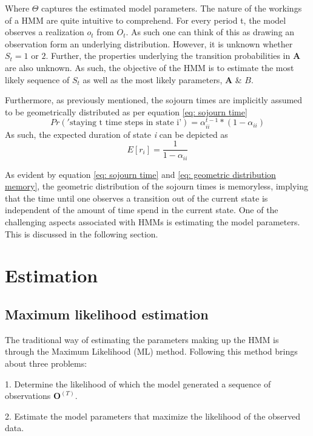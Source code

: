 Where $\Theta$ captures the estimated model parameters. The nature of the workings of a HMM are quite intuitive to comprehend. For every period t, the model observes a realization $o_t$ from $O_t$. As such one can think of this as drawing an observation form an underlying distribution. However, it is unknown whether $S_t = 1$ or $2$. Further, the properties underlying the transition probabilities in $\mathbf{A}$ are also unknown. As such, the objective of the HMM is to estimate the most likely sequence of $S_t$ as well as the most likely parameters, $\mathbf{A}$ \& $B$. 

Furthermore, as previously mentioned, the sojourn times are implicitly assumed to be geometrically distributed as per equation \ref{eq: sojourn time}
\begin{equation}
    Pr('\text{staying t time steps in state i'}) = \alpha^{t-1}_{ii} *(1-\alpha_{ii})
    \label{eq: sojourn time}
\end{equation}
As such, the expected duration of state \textit{i} can be depicted as 
\begin{equation}
    E[r_i] = \frac{1}{1-\alpha_{ii}}
    \label{eq: geometric distribution memory}
\end{equation}

As evident by equation \ref{eq: sojourn time} and \ref{eq: geometric distribution memory}, the geometric distribution of the sojourn times is memoryless, implying that the time until one observes a transition out of the current state is independent of the amount of time spend in the current state. One of the challenging aspects associated with HMMs is estimating the model parameters. This is discussed in the following section.

\section{Estimation}
\label{section:estimation}

\subsection{Maximum likelihood estimation}
The traditional way of estimating the parameters making up the HMM is through the Maximum Likelihood
(ML) method. Following this method brings about three problems:

    1. Determine the likelihood of which the model generated a sequence of  observations $\mathbf{O}^{(T)}$. 
    
    2. Estimate the model parameters that maximize the likelihood of the observed data.

